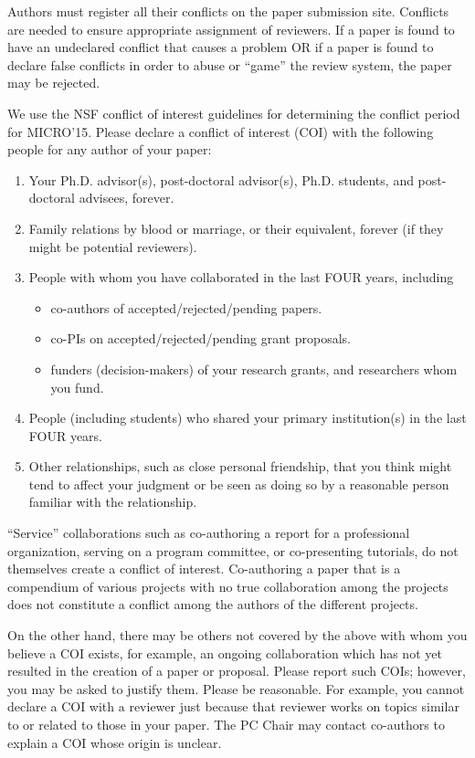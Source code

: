 \documentclass{sig-alternate}
\begin{document}
Authors must register all their conflicts on the paper submission site.
Conflicts are needed to ensure appropriate assignment of reviewers.  
If a paper is found to have an undeclared conflict that causes
a problem OR if a paper is found to declare false conflicts in order to
abuse or ``game'' the review system, the paper may be rejected.

We use the NSF conflict of interest guidelines for determining the
conflict period for MICRO'15.  Please declare a conflict of interest
(COI) with the following people for any author of your paper:

\begin{enumerate}
\item Your Ph.D. advisor(s), post-doctoral advisor(s), Ph.D. students, 
      and post-doctoral advisees, forever. 
\item Family relations by blood or marriage, or their equivalent, 
      forever (if they might be potential reviewers).
\item People with whom you have collaborated in the last FOUR years, including 
\begin{itemize}
\item co-authors of accepted/rejected/pending papers.
\item co-PIs on accepted/rejected/pending grant proposals.
\item funders (decision-makers) of your research grants, and researchers 
      whom you fund. 
\end{itemize}
\item People (including students) who shared your primary institution(s) in the 
last FOUR years. 
\item Other relationships, such as close personal friendship, that you think might tend
to affect your judgment or be seen as doing so by a reasonable person familiar
with the relationship.
\end{enumerate}

``Service'' collaborations such as co-authoring a report for a professional 
organization, serving on a program committee, or co-presenting 
tutorials, do not themselves create a conflict of interest. 
Co-authoring a paper that is a compendium of various projects with 
no true collaboration among the projects does not constitute a 
conflict among the authors of the different projects.

On the other hand, there may be others not covered by the above with
whom you believe a COI exists, for example, an ongoing collaboration
which has not yet resulted in the creation of a paper or proposal.
Please report such COIs; however, you may be asked to justify them.
Please be reasonable. For example, you cannot declare a COI with a
reviewer just because that reviewer works on topics similar to or
related to those in your paper.  The PC Chair may contact co-authors
to explain a COI whose origin is unclear.
\end{document}
